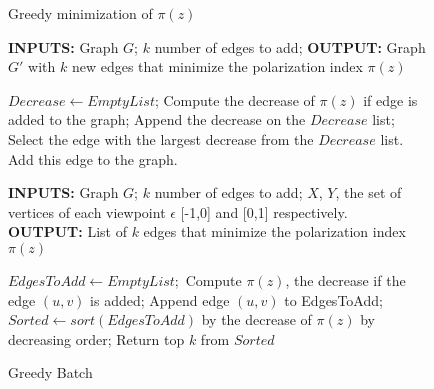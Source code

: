 \begin{figure}
 	\begin{minipage}[b]{1\linewidth}
    		\begin{algorithm}[H]
		
			\caption{Greedy minimization of $\pi(z)$}
			\label{alg:greedyAlgo}
			
			\begin{flushleft}
        				\textbf{INPUTS:} Graph $G$; $k$ number of edges to add;
				\vspace{6pt}
        				\textbf{OUTPUT:} Graph $G'$ with $k$ new edges that minimize the polarization index $\pi(z)$
			\end{flushleft}
			
			\begin{algorithmic}[1]
				\FOR {$i = 1:k \ $}
					\STATE$Decrease \leftarrow Empty List$;
					\FOR { each  edge in $|V| \times |V| \textbackslash E$}
						\STATE Compute the decrease of $\pi(z)$ if edge is added to the graph;
						\STATE Append the decrease on the $Decrease$ list;
					\ENDFOR
					\STATE Select the edge with the largest decrease from the $Decrease$ list.
					\STATE Add this edge to the graph.
				\ENDFOR
			\end{algorithmic}
			
		\end{algorithm}
		\bigskip
  	\end{minipage}
  	\begin{minipage}[b]{1\linewidth}
     		\begin{algorithm}[H]
		
			\caption{Greedy Batch}
			\label{alg:greedyBatch}
			
			\begin{flushleft}
        				\textbf{INPUTS:} Graph $G$; $k$ number of edges to add;
				$X$, $Y $, the set of vertices of each viewpoint $\epsilon$ [-1,0] and [0,1] respectively.\\
				\vspace{6pt}
        				\textbf{OUTPUT:} List of $k$ edges that minimize the polarization index $\pi(z)$
			\end{flushleft}
			
			\begin{algorithmic}[1]
				\STATE $EdgesToAdd \leftarrow Empty List;$
					\STATE Compute $\pi(z)$, the decrease if the edge $(u,v)$ is added;
					\STATE Append edge $(u,v)$ to EdgesToAdd;
				\ENDFOR
				\STATE $Sorted \leftarrow sort(EdgesToAdd)$ by the decrease of $\pi(z)$ by decreasing order;
				\STATE Return top $k$ from $Sorted$
			\end{algorithmic}
			
		\end{algorithm}
	\end{minipage}%
\end{figure}


